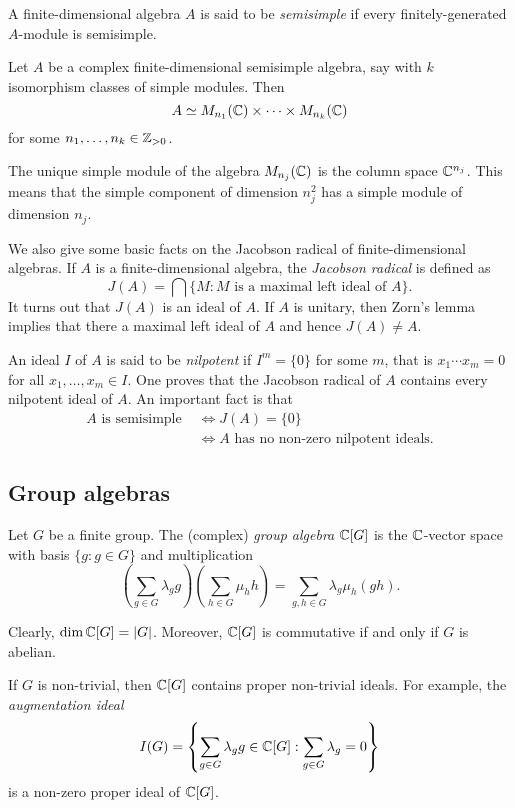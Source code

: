 A finite-dimensional algebra $A$ is said to be \emph{semisimple} if
every finitely-generated $A$-module is semisimple. 

\begin{theorem}
Let $A$ be a complex finite-dimensional semisimple algebra, say with  
$k$ isomorphism classes of simple modules. Then 
\[
A\simeq M_{n_1}(\mathbb{C})\times\cdots\times M_{n_k}(\mathbb{C})
\]
for some $n_1,\dots,n_k\in\mathbb{Z}_{>0}$. \end{theorem}

The unique simple module of the algebra $M_{n_j}(\mathbb{C})$ 
is the column space $\mathbb{C}^{n_j}$. This means that the simple component of dimension $n_j^2$ has a simple module of dimension $n_j$. 

We also give some basic facts on the Jacobson radical
of finite-dimensional algebras. If $A$ is a finite-dimensional algebra, the \emph{Jacobson radical} is defined as 
\[
J(A)=\bigcap\{M:M\text{ is a maximal left ideal of $A$}\}. 
\]
It turns out that $J(A)$ is an ideal of $A$. If $A$ is
unitary, then Zorn's lemma implies that there a 
maximal left ideal of $A$ and hence $J(A)\ne A$. 

An ideal $I$ of $A$ is said to be \emph{nilpotent}
if $I^m=\{0\}$ for some $m$, that is 
$x_1\cdots x_m=0$ for all $x_1,\dots,x_m\in I$. 
One proves that the Jacobson radical of $A$ 
contains every nilpotent ideal of $A$. An important
fact is that 
\begin{align*}
A\text{ is semisimple }
&\Longleftrightarrow 
J(A)=\{0\}\\
&\Longleftrightarrow 
A\text{ has no non-zero nilpotent ideals}.
\end{align*}

\subsection{Group algebras}

Let $G$ be a finite group. The (complex) \emph{group
algebra} $\mathbb{C}[G]$ is the $\mathbb{C}$-vector space with
basis $\{g:g\in G\}$ and multiplication
\[
\left(\sum_{g\in G}\lambda_gg\right)\left(\sum_{h\in G}\mu_hh\right)
=\sum_{g,h\in G}\lambda_g\mu_h(gh).
\]

Clearly, $\dim \mathbb{C}[G]=|G|$. Moreover, 
$\mathbb{C}[G]$ is commutative if and only if $G$ is abelian. 

If $G$ is non-trivial, 
then $\mathbb{C}[G]$ contains proper non-trivial ideals. For example, 
the \emph{augmentation ideal} 
\[
I(G)=\left\{\sum_{g\in G}\lambda_gg\in \mathbb{C}[G]:\sum_{g\in G}\lambda_g=0\right\}
\]
is a non-zero proper ideal of $\mathbb{C}[G]$. 


